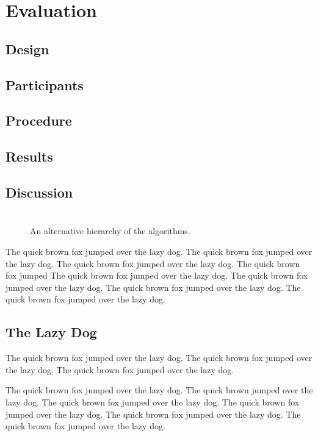 \documentclass{l4proj}
\begin{document}
\chapter{Evaluation}
\section{Design}
\section{Participants}
\section{Procedure}
\section{Results}
\section{Discussion}

\chapter{}



\begin{figure}
\centering
\vspace{-30mm}
\caption{An alternative hierarchy of the algorithms.}
\label{uroborus}
\end{figure}

The quick brown fox jumped over the lazy dog.
The quick brown fox jumped over the lazy dog.
The quick brown fox jumped over the lazy dog.
The quick brown fox jumped
The quick brown fox jumped over the lazy dog.
The quick brown fox jumped over the lazy dog.
The quick brown fox jumped over the lazy dog.
The quick brown fox jumped over the lazy dog.

\section{The Lazy Dog}
The quick brown fox jumped over the lazy dog.
The quick brown fox jumped over the lazy dog.
The quick brown fox jumped over the lazy dog.

The quick brown fox jumped over the lazy dog.
The quick brown  jumped over the lazy dog.
The quick brown fox jumped over the lazy dog.
The quick brown fox jumped over the lazy dog.
The quick brown fox jumped over the lazy dog.
The quick brown fox jumped over the lazy dog.
\end{document}
